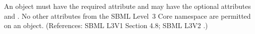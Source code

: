 An \InitialAssignment object must have the required attribute
 and may have the optional attributes   and
.  No other attributes from the SBML Level~3 Core namespace
are permitted on an \InitialAssignment object.  (References: SBML L3V1 Section 4.8; SBML L3V2
.)
